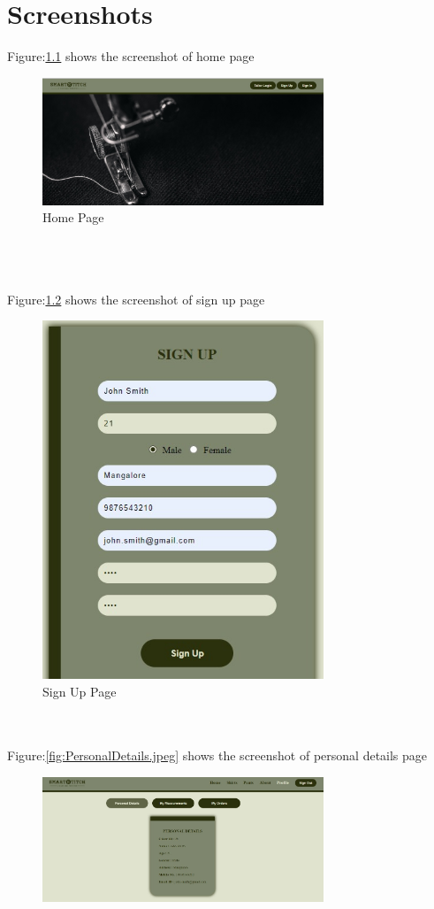 \documentclass[12pt, letter paper]{report}
\begin{document}
{\chapter{Screenshots}

Figure:\ref{fig:HomePage.jpeg} shows the screenshot of home page 
\begin{figure}[h]
 \centering
 \includegraphics[width=0.75\textwidth]{HomePage.jpeg}
 \caption{Home Page}
 \label{fig:HomePage.jpeg}
\end{figure}
\\
\\
\\
Figure:\ref{fig:signup.jpeg} shows the screenshot of sign up page
\begin{figure}[h]
 \centering
\includegraphics[width=0.75\textwidth,height=0.5\textwidth]{signup.jpeg}
 \caption{Sign Up Page}
 \label{fig:signup.jpeg}
\end{figure}
\\
\\
Figure:\ref{fig:PersonalDetails.jpeg} shows the screenshot of personal details page
\begin{figure}[h]
 \centering
 \includegraphics[width=0.75\textwidth]{PersonalDetails.jpeg}

\end{figure}}
\end{document}

